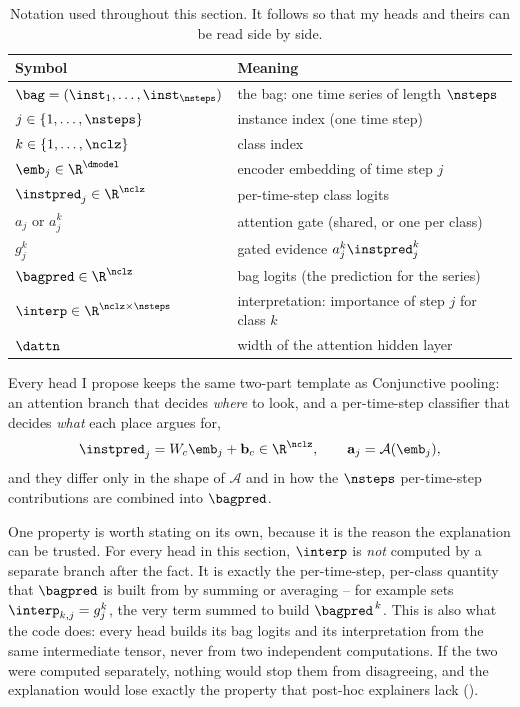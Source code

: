 \begin{table}[h]
\caption{Notation used throughout this section. It follows \citet{early2024millet} so that my heads
and theirs can be read side by side.}
\label{tab:notation}
\begin{center}
\small
\begin{tabular}{ll}
\toprule
\textbf{Symbol} & \textbf{Meaning} \\
\midrule
$\bag = (\inst_1,\dots,\inst_{\nsteps})$ & the bag: one time series of length $\nsteps$ \\
$j \in \{1,\dots,\nsteps\}$              & instance index (one time step) \\
$k \in \{1,\dots,\nclz\}$                & class index \\
$\emb_j \in \R^{\dmodel}$                & encoder embedding of time step $j$ \\
$\instpred_j \in \R^{\nclz}$             & per-time-step class logits \\
$a_j$ or $a_j^k$                         & attention gate (shared, or one per class) \\
$g_j^k$                                  & gated evidence $a_j^k \instpred_j^k$ \\
$\bagpred \in \R^{\nclz}$                & bag logits (the prediction for the series) \\
$\interp \in \R^{\nclz \times \nsteps}$  & interpretation: importance of step $j$ for class $k$ \\
$\dattn$                                 & width of the attention hidden layer \\
\bottomrule
\end{tabular}
\end{center}
\end{table}

Every head I propose keeps the same two-part template as Conjunctive pooling: an attention branch
that decides \emph{where} to look, and a per-time-step classifier that decides \emph{what} each
place argues for,
\begin{equation}
  \instpred_j = W_c \emb_j + \mathbf{b}_c \in \R^{\nclz},
  \qquad
  \mathbf{a}_j = \mathcal{A}(\emb_j) ,
  \label{eq:common_template}
\end{equation}
and they differ only in the shape of $\mathcal{A}$ and in how the $\nsteps$ per-time-step
contributions are combined into $\bagpred$.

One property is worth stating on its own, because it is the reason the explanation can be trusted.
For every head in this section, $\interp$ is \emph{not} computed by a separate branch after the
fact. It is exactly the per-time-step, per-class quantity that $\bagpred$ is built from by summing
or averaging -- for example  sets $\interp_{k,j} = g_j^k$, the very term summed to
build $\bagpred^{\,k}$. This is also what the code does: every head builds its bag logits and its
interpretation from the same intermediate tensor, never from two independent computations. If the
two were computed separately,
nothing would stop them from disagreeing, and the explanation would lose exactly the property that
post-hoc explainers lack ().

